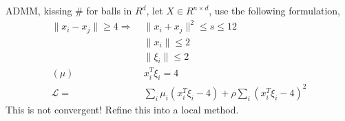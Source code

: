 \begin{frame}{ADMM, kissing \#}
  for balls in \(R^d\), let \(X \in R^{n\times d}\), use the following formulation,
  \begin{align*}
    \| x_i - x_j \| \ge 4 \Rightarrow\; & \|x_i + x_j\|^2 \le s \le 12                                         \\
                                        & \| x_i \| \le 2                                                      \\
                                        & \| \xi_i \| \le 2                                                    \\
    (\mu)\;                             & x_i ^T \xi_i = 4                                                     \\
    \mathcal L = \;                     & \sum_i \mu_i (x_i ^T \xi_i - 4 ) + \rho \sum_i (x_i ^T \xi_i - 4 )^2
  \end{align*}
  This is not convergent! Refine this into a local method.
\end{frame}

